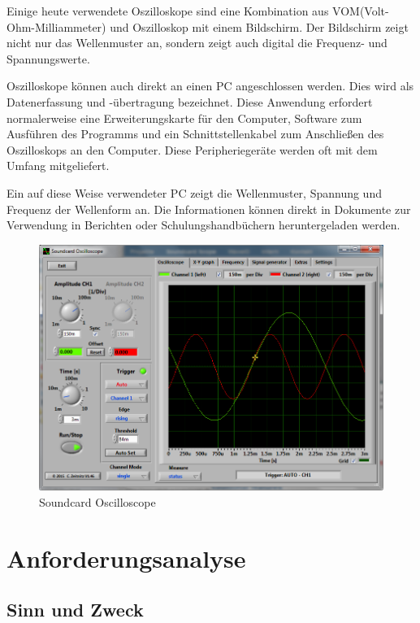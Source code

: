 \documentclass{article}
\begin{document}
Einige heute verwendete Oszilloskope sind eine Kombination aus VOM(Volt-Ohm-Milliammeter) und Oszilloskop mit einem Bildschirm. Der Bildschirm zeigt nicht nur das Wellenmuster an, sondern zeigt auch digital die Frequenz- und Spannungswerte.

Oszilloskope können auch direkt an einen PC angeschlossen werden. Dies wird als Datenerfassung und -übertragung bezeichnet. Diese Anwendung erfordert normalerweise eine Erweiterungskarte für den Computer, Software zum Ausführen des Programms und ein Schnittstellenkabel zum Anschließen des Oszilloskops an den Computer. Diese Peripheriegeräte werden oft mit dem Umfang mitgeliefert.

Ein auf diese Weise verwendeter PC zeigt die Wellenmuster, Spannung und Frequenz der Wellenform an. Die Informationen können direkt in Dokumente zur Verwendung in Berichten oder Schulungshandbüchern heruntergeladen werden. \cite{electrivalacademica}
\begin{figure}[H]
  \includegraphics[width=\textwidth]{"scope_146_en"}
  \caption[\textbf{scope_146_en.png},  Quelle:https:https://www.zeitnitz.eu/scope_en (zuletzt abgerufen: 04.09.2021)]{Soundcard Oscilloscope}
\end{figure}
\newline

\section{Anforderungsanalyse}
\subsection{Sinn und Zweck}
\end{document}
